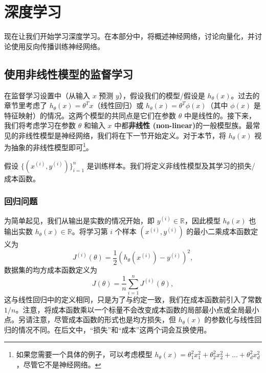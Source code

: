 \chapter{深度学习}\label{chapter:7}
现在让我们开始学习深度学习。在本部分中，将概述神经网络，讨论向量化，并讨论使用反向传播训练神经网络。

\section{使用非线性模型的监督学习}\label{sec:7.1}

在监督学习设置中（从输入 $x$ 预测 $y$），假设我们的模型/假设是 $h_\theta(x)$。过去的章节里考虑了 $h_\theta(x) = \theta^T x$（线性回归）或 $h_\theta(x) = \theta^T \phi(x)$（其中 $\phi(x)$ 是特征映射）的情况。这两个模型的共同点是它们在参数 $\theta$ 中是线性的。接下来，我们将考虑学习在参数 $\theta$ 和输入 $x$ 中都\textbf{非线性 (non-linear)}的一般模型族。最常见的非线性模型是神经网络，我们将在下一节开始定义。对于本节，将 $h_\theta(x)$ 视为抽象的非线性模型即可\footnote{如果您需要一个具体的例子，可以考虑模型 $h_\theta(x) = \theta_1^2 x_1^2 + \theta_2^2 x_2^2 + \dots + \theta_d^2 x_d^2$，尽管它不是神经网络。}。

假设 $\{(x^{(i)}, y^{(i)})\}_{i=1}^n$ 是训练样本。我们将定义非线性模型及其学习的损失/成本函数。

\subsection*{回归问题}

为简单起见，我们从输出是实数的情况开始，即 $y^{(i)} \in \mathbb{R}$，因此模型 $h_\theta(x)$ 也输出实数 $h_\theta(x) \in \mathbb{R}$。将学习第 $i$ 个样本 $(x^{(i)}, y^{(i)})$ 的最小二乘成本函数定义为
\begin{equation} \label{eq:7.1}
    J^{(i)}(\theta) = \frac{1}{2} (h_\theta(x^{(i)}) - y^{(i)})^2,
\end{equation}
数据集的均方成本函数定义为
\begin{equation} \label{eq:7.2}
    J(\theta) = \frac{1}{n} \sum_{i=1}^n J^{(i)}(\theta),
\end{equation}
这与线性回归中的定义相同，只是为了与约定一致，我们在成本函数前引入了常数 $1/n$。注意，将成本函数乘以一个标量不会改变成本函数的局部最小点或全局最小点。另请注意，尽管成本函数的形式也是均方损失，但 $h_\theta(x)$ 的参数化与线性回归的情况不同。在后文中，“损失”和“成本”这两个词会互换使用。

